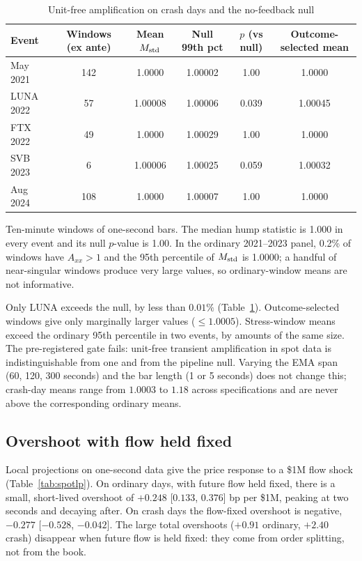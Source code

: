 \begin{table}[t]\centering\small
\begin{threeparttable}
\caption{Unit-free amplification on crash days and the no-feedback null}\label{tab:spotnull}
\begin{tabular}{lccccc}
\toprule
Event & Windows (ex ante) & Mean $M_{\rm std}$ & Null 99th pct & $p$ (vs null) & Outcome-selected mean\\
\midrule
May 2021 & 142 & 1.0000 & 1.00002 & 1.00 & 1.0000\\
LUNA 2022 & 57 & 1.00008 & 1.00006 & 0.039 & 1.00045\\
FTX 2022 & 49 & 1.0000 & 1.00029 & 1.00 & 1.0000\\
SVB 2023 & 6 & 1.00006 & 1.00025 & 0.059 & 1.00032\\
Aug 2024 & 108 & 1.0000 & 1.00007 & 1.00 & 1.0000\\
\bottomrule
\end{tabular}
\begin{tablenotes}\footnotesize\item Ten-minute windows of one-second bars. The median hump statistic is 1.000 in every event and its null $p$-value is 1.00. In the ordinary 2021--2023 panel, 0.2\% of windows have $A_{xx}>1$ and the 95th percentile of $M_{\rm std}$ is 1.0000; a handful of near-singular windows produce very large values, so ordinary-window means are not informative. \end{tablenotes}
\end{threeparttable}
\end{table}

Only LUNA exceeds the null, by less than $0.01\%$ (Table~\ref{tab:spotnull}). Outcome-selected windows give only marginally larger values ($\le1.0005$). Stress-window means exceed the ordinary 95th percentile in two events, by amounts of the same size. The pre-registered gate fails: unit-free transient amplification in spot data is indistinguishable from one and from the pipeline null. Varying the EMA span (60, 120, 300 seconds) and the bar length (1 or 5 seconds) does not change this; crash-day means range from $1.0003$ to $1.18$ across specifications and are never above the corresponding ordinary means.

\subsection{Overshoot with flow held fixed}
Local projections on one-second data give the price response to a \$1M flow shock (Table~\ref{tab:spotlp}). On ordinary days, with future flow held fixed, there is a small, short-lived overshoot of $+0.248$ [$0.133$, $0.376$] bp per \$1M, peaking at two seconds and decaying after. On crash days the flow-fixed overshoot is negative, $-0.277$ [$-0.528$, $-0.042$]. The large total overshoots ($+0.91$ ordinary, $+2.40$ crash) disappear when future flow is held fixed: they come from order splitting, not from the book.

